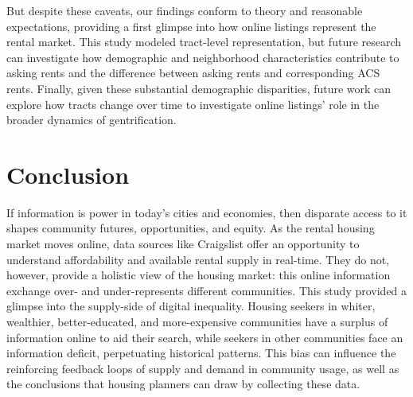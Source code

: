 \documentclass[11pt,onecolumn]{article} %
\begin{document}
But despite these caveats, our findings conform to theory and reasonable expectations, providing a first glimpse into how online listings represent the rental market. This study modeled tract-level representation, but future research can investigate how demographic and neighborhood characteristics contribute to asking rents and the difference between asking rents and corresponding ACS rents. Finally, given these substantial demographic disparities, future work can explore how tracts change over time to investigate online listings' role in the broader dynamics of gentrification.

\section{Conclusion}

If information is power in today's cities and economies, then disparate access to it shapes community futures, opportunities, and equity. As the rental housing market moves online, data sources like Craigslist offer an opportunity to understand affordability and available rental supply in real-time. They do not, however, provide a holistic view of the housing market: this online information exchange over- and under-represents different communities. This study provided a glimpse into the supply-side of digital inequality. Housing seekers in whiter, wealthier, better-educated, and more-expensive communities have a surplus of information online to aid their search, while seekers in other communities face an information deficit, perpetuating historical patterns. This bias can influence the reinforcing feedback loops of supply and demand in community usage, as well as the conclusions that housing planners can draw by collecting these data.




\setlength{\bibsep}{0.00cm plus 0.05cm} %




\end{document}
